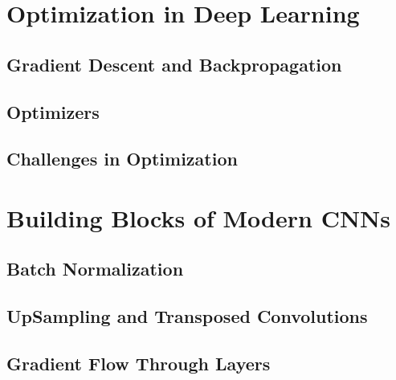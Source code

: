 \chapter{Optimization in Deep Learning}
\section{Gradient Descent and Backpropagation}
\section{Optimizers}
\section{Challenges in Optimization}

\chapter{Building Blocks of Modern CNNs}
\section{Batch Normalization}
\section{UpSampling and Transposed Convolutions}
\section{Gradient Flow Through Layers}
